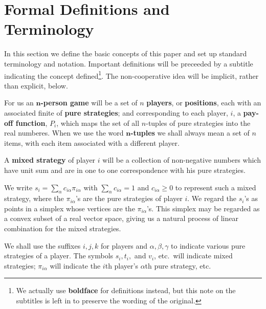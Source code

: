 \section{Formal Definitions and Terminology}
\hspace{\parindent}In this section we define the basic concepts of this paper and set up standard terminology and notation. Important definitions will be preceeded by a subtitle indicating the concept defined\footnote{We actually use \textbf{boldface} for definitions instead, but this note on the subtitles is left in to preserve the wording of the original.}. The non-cooperative idea will be implicit, rather than explicit, below.
\begin{definition}
    For us an $\mathbf n$\textbf{-person game} will be a set of $n$ \textbf{players}, or \textbf{positions}, each with an associated finite of \textbf{pure strategies}; and corresponding to each player, $i$, a \textbf{pay-off function}, $P_i $, which maps the set of all $n$-tuples of pure strategies into the real numberes. When we use the word $\mathbf n$\textbf{-tuples} we shall always mean a set of $n$ items, with each item associated with a different player.
\end{definition}
\begin{definition}
   A \textbf{mixed strategy} of player $i$ will be a collection of non-negative numbers which have unit sum and are in one to one correspondence with his pure strategies.
\end{definition}
   We write $s_i=\sum_{\alpha }^{} c_{i\alpha }\pi_{i\alpha } $ with $\sum_{\alpha }^{} c_{i\alpha }=1 $ and $c_{i\alpha }\geq 0$ to represent such a mixed strategy, where the $\pi_{i\alpha }$'s are the pure strategies of player $i$. We regard the $s_i $'s as points in a simplex whose vertices are the $\pi_{i\alpha }$'s. This simplex may be regarded as a convex subset of a real vector space, giving us a natural process of linear combination for the mixed strategies.

   We shall use the suffixes $i,j,k$ for players and $\alpha ,\beta ,\gamma $ to indicate various pure strategies of a player. The symbols $s_i ,t_i ,$ and $v_i $, etc.\ will indicate mixed strategies; $\pi_{i\alpha }$ will indicate the $i$th player's $\alpha $th pure strategy, etc.

